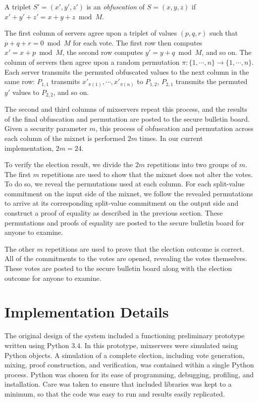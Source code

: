 \begin{definition}
A triplet $S' = (x', y', z')$ is an \emph{obfuscation} of $S = (x, y, z)$ if $x'+y'+z' = x+y+z \bmod M$.
\end{definition}

The first column of servers agree upon a triplet of values $(p, q, r)$ such that $p + q + r = 0 \bmod M$ for each vote. The first row then computes $x' = x+p \bmod M$, the second row computes $y' = y+q \bmod M$, and so on. The column of servers then agree upon a random permutation $\pi : \{1, \cdots, n\} \to \{1, \cdots, n\}$. Each server transmits the permuted obfuscated values to the next column in the same row: $P_{1,1}$ transmits $x'_{\pi(1)}, \cdots, x'_{\pi(n)}$ to $P_{1,2}$, $P_{2,1}$ transmits the permuted $y'$ values to $P_{2,2}$, and so on.

The second and third columns of mixservers repeat this process, and the results of the final obfuscation and permutation are posted to the secure bulletin board. Given a security parameter $m$, this process of obfuscation and permutation across each column of the mixnet is performed $2m$ times. In our current implementation, $2m = 24$.

To verify the election result, we divide the $2m$ repetitions into two groups of $m$. The first $m$ repetitions are used to show that the mixnet does not alter the votes. To do so, we reveal the permutations used at each column. For each split-value commitment on the input side of the mixnet, we follow the revealed permutations to arrive at its corresponding split-value commitment on the output side and construct a proof of equality as described in the previous section. These permutations and proofs of equality are posted to the secure bulletin board for anyone to examine.

The other $m$ repetitions are used to prove that the election outcome is correct. All of the commitments to the votes are opened, revealing the votes themselves. These votes are posted to the secure bulletin board along with the election outcome for anyone to examine.

\section{Implementation Details}

The original design of the system included a functioning preliminary prototype written using Python 3.4. In this prototype, mixservers were simulated using Python objects. A simulation of a complete election, including vote generation, mixing, proof construction, and verification, was contained within a single Python process. Python was chosen for its ease of programming, debugging, profiling, and installation. Care was taken to ensure that included libraries was kept to a minimum, so that the code was easy to run and results easily replicated.

